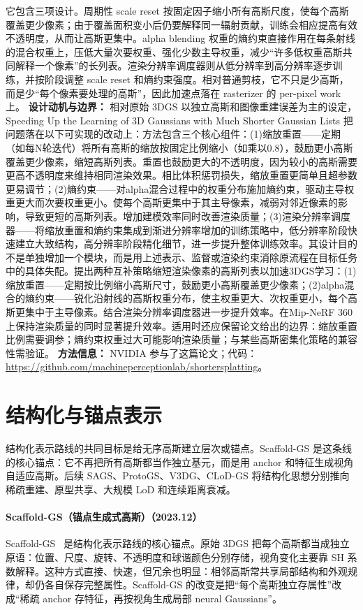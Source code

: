 它包含三项设计。周期性 scale reset 按固定因子缩小所有高斯尺度，使每个高斯覆盖更少像素；由于覆盖面积变小后仍要解释同一辐射贡献，训练会相应提高有效不透明度，从而让高斯更集中。alpha blending 权重的熵约束直接作用在每条射线的混合权重上，压低大量次要权重、强化少数主导权重，减少“许多低权重高斯共同解释一个像素”的长列表。渲染分辨率调度器则从低分辨率到高分辨率逐步训练，并按阶段调整 scale reset 和熵约束强度。相对普通剪枝，它不只是少高斯，而是少“每个像素要处理的高斯”，因此加速点落在 rasterizer 的 per-pixel work 上。
\textbf{设计动机与边界：} 相对原始 3DGS 以独立高斯和图像重建误差为主的设定，Speeding Up the Learning of 3D Gaussians with Much Shorter Gaussian Lists 把问题落在以下可实现的改动上：方法包含三个核心组件：(1)缩放重置——定期（如每N轮迭代）将所有高斯的缩放按固定比例缩小（如乘以0.8），鼓励更小高斯覆盖更少像素，缩短高斯列表。重置也鼓励更大的不透明度，因为较小的高斯需要更高不透明度来维持相同渲染效果。相比体积惩罚损失，缩放重置更简单且超参数更易调节；(2)熵约束——对alpha混合过程中的权重分布施加熵约束，驱动主导权重更大而次要权重更小。使每个高斯更集中于其主导像素，减弱对邻近像素的影响，导致更短的高斯列表。增加建模效率同时改善渲染质量；(3)渲染分辨率调度器——将缩放重置和熵约束集成到渐进分辨率增加的训练策略中，低分辨率阶段快速建立大致结构，高分辨率阶段精化细节，进一步提升整体训练效率。其设计目的不是单独增加一个模块，而是用上述表示、监督或渲染约束消除原流程在目标任务中的具体失配。提出两种互补策略缩短渲染像素的高斯列表以加速3DGS学习：(1)缩放重置——定期按比例缩小高斯尺寸，鼓励更小高斯覆盖更少像素；(2)alpha混合的熵约束——锐化沿射线的高斯权重分布，使主权重更大、次权重更小，每个高斯更集中于主导像素。结合渲染分辨率调度器进一步提升效率。在Mip-NeRF 360上保持渲染质量的同时显著提升效率。适用时还应保留论文给出的边界：缩放重置比例需要调参；熵约束权重过大可能影响渲染质量；与某些高斯密集化策略的兼容性需验证。
\textbf{方法信息：} NVIDIA 参与了这篇论文；代码：\url{https://github.com/machineperceptionlab/shortersplatting}。
\section{结构化与锚点表示}

结构化表示路线的共同目标是给无序高斯建立层次或锚点。Scaffold-GS 是这条线的核心锚点：它不再把所有高斯都当作独立基元，而是用 anchor 和特征生成视角自适应高斯。后续 SAGS、ProtoGS、V3DG、CLoD-GS 将结构化思想分别推向稀疏重建、原型共享、大规模 LoD 和连续距离衰减。


\paragraph{Scaffold-GS（锚点生成式高斯）（2023.12）}
Scaffold-GS~\cite{2312_00109} 是结构化表示路线的核心锚点。原始 3DGS 把每个高斯都当成独立原语：位置、尺度、旋转、不透明度和球谐颜色分别存储，视角变化主要靠 SH 系数解释。这种方式直接、快速，但冗余也明显：相邻高斯常共享局部结构和外观规律，却仍各自保存完整属性。Scaffold-GS 的改变是把“每个高斯独立存属性”改成“稀疏 anchor 存特征，再按视角生成局部 neural Gaussians”。

